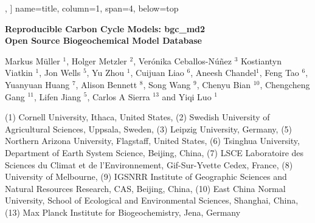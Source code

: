 \documentclass[36pt]{article}
\begin{document}
\begin{tcbposter}
{},
]{
name=title,
column=1,
span=4,
below=top}{
\resizebox*{!}{2cm}
{ \bfseries Reproducible Carbon Cycle Models: \Large{bgc\_md2} }\\[6mm]
{ \bfseries Open Source Biogeochemical Model Database}\\[6mm]
\begin{minipage}{150cm}
\begin{center}
\small{
Markus Müller $^1$, 
Holger Metzler $^2$,
Ver\'onika Ceballos-N\'u\~nez $^3$
Kostiantyn Viatkin $^1$,
Jon Wells $^5$,
Yu Zhou $^1$,
Cuijuan Liao $^6$,
Aneesh Chandel$^1$,
Feng Tao $^6$,
Yuanyuan Huang $^7$,
Alison Bennett $^8$,
Song Wang $^9$,
Chenyu Bian $^{10}$,
Chengcheng Gang $^{11}$,
{Lifen Jiang $^{5}$},
Carlos A Sierra $^{13}$ and Yiqi Luo $^1$
}
\end{center}
\tiny{ 
(1) Cornell University, 
Ithaca, United States, 
(2) Swedish University of Agricultural Sciences, 
Uppsala, Sweden, 
(3) Leipzig University, 
Germany, 
(5) Northern Arizona University, 
Flagstaff, United States, 
(6) Tsinghua University, Department of Earth System Science, Beijing, China, 
(7) LSCE Laboratoire des Sciences du Climat et de l'Environnement, 
Gif-Sur-Yvette Cedex, France, 
(8) University of Melbourne, 
(9) IGSNRR Institute of Geographic Sciences and Natural Resources Research, CAS, 
Beijing, China, 
(10) East China Normal University, School of Ecological and Environmental Sciences, Shanghai, China, 
(13) Max Planck Institute for Biogeochemistry, 
Jena, Germany
}
\end{minipage}
}


\end{tcbposter}
\end{document}
